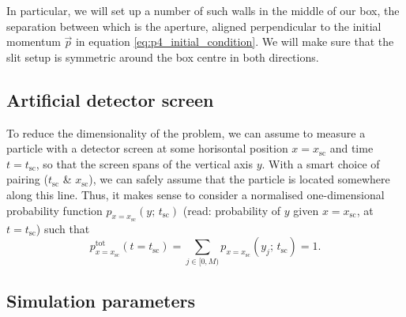     In particular, we will set up a number of such walls in the middle of our box, the separation between which is the aperture, aligned perpendicular to the initial momentum $\vec{p}$ in equation \eqref{eq:p4_initial_condition}. We will make sure that the slit setup is symmetric around the box centre in both directions.


\subsection{Artificial detector screen}\label{sec:method:screen}

    To reduce the dimensionality of the problem, we can assume to measure a particle with a detector screen at some horisontal position $x=x_\mathrm{sc}$ and time $t=t_\mathrm{sc}$, so that the screen spans of the vertical axis $y$. With a smart choice of pairing ($t_\mathrm{sc}$ \& $x_\mathrm{sc}$), we can safely assume that the particle is located somewhere along this line. Thus, it makes sense to consider a normalised one-dimensional probability function $p_{x=x_\mathrm{sc}}(y;\, t_\mathrm{sc})$ (read: probability of $y$ given $x=x_\mathrm{sc}$, at $t=t_\mathrm{sc}$) such that
    \begin{equation}\label{eq:tot_probability_along_y}
        p^\mathrm{tot}_{x=x_\mathrm{sc}}(t\!=\!t_\mathrm{sc}) =\sum_{j\in [0, M)} p_{x=x_\mathrm{sc}}(y_j;\, t_\mathrm{sc}) = 1.
    \end{equation}



\subsection{Simulation parameters}\label{sec:method:simulation_parameters}

